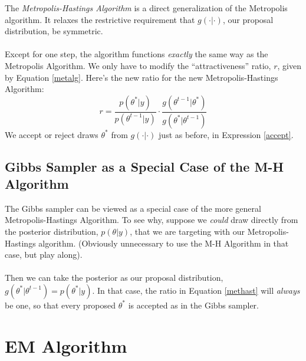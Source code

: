 \documentclass[a4paper,12pt]{scrartcl}
\begin{document}
The \emph{Metropolis-Hastings Algorithm} is a direct generalization
of the Metropolis algorithm. It relaxes the restrictive 
requirement that $g(\cdot|\cdot)$, our proposal distribution, be 
symmetric.
\\
\\
Except for one step, the algorithm functions \emph{exactly} the same
way as the Metropolis Algorithm. We only have to modify the 
``attractiveness'' ratio, $r$, given by Equation \ref{metalg}. Here's
the new ratio for the new Metropolis-Hastings Algorithm:
\begin{equation}
   \label{methast}
   r = \frac{ p(\theta^* | y) }{p(\theta^{t-1} | y)} \cdot 
   \frac{ g(\theta^{t-1} | \theta^*)}{ g(\theta^* | \theta^{t-1})} 
\end{equation}
We accept or reject draws $\theta^*$ from $g(\cdot | \cdot)$
just as before, in Expression \ref{accept}.

\subsection{Gibbs Sampler as a Special Case of the M-H
   Algorithm}
The Gibbs sampler can be viewed as a special case of the more general 
Metropolis-Hastings Algorithm. To see why,
suppose we \emph{could} draw directly from the posterior distribution,
$p(\theta | y)$, that we are targeting with our Metropolis-Hastings
algorithm. (Obviously unnecessary to use the M-H Algorithm in that case,
but play along). 
\\
\\
Then we can take the posterior as our proposal distribution, 
$g(\theta^*| \theta^{t-1}) = p(\theta^*| y)$. In that case, the 
ratio in Equation \ref{methast} will \emph{always} be one, so that
every proposed $\theta^*$ is accepted as in the Gibbs sampler.

\newpage
\section{EM Algorithm}
\end{document}

